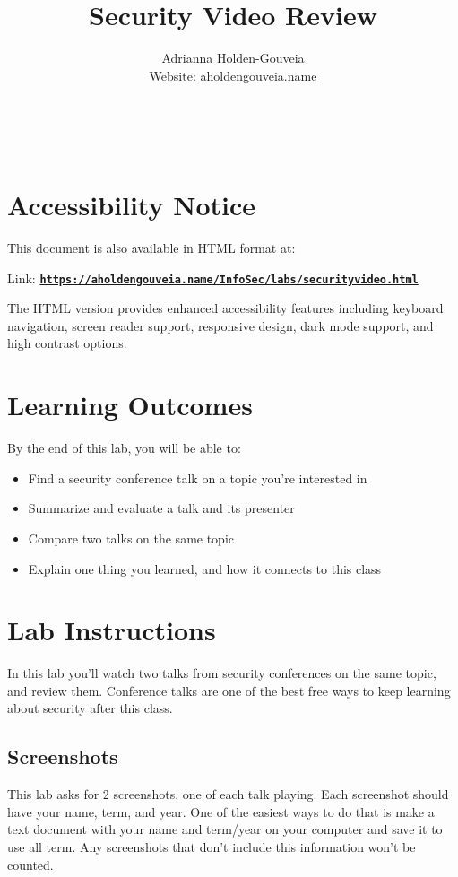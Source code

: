 \documentclass[12pt]{article}
\title{Security Video Review}
\author{
        Adrianna Holden-Gouveia \\
        Website: \href{https://aholdengouveia.name}{aholdengouveia.name}\\ 
        \date{\vspace{-5ex}}
        \faGithub {: aholdengouveia} \\
        \faTwitter {: aholdengouveia} \\
        }
\begin{document}
    

\maketitle

\section*{Accessibility Notice}
This document is also available in HTML format at:

Link: \href{https://aholdengouveia.name/InfoSec/labs/securityvideo.html}{\textbf{\nolinkurl{https://aholdengouveia.name/InfoSec/labs/securityvideo.html}}}

The HTML version provides enhanced accessibility features including keyboard navigation, screen reader support, responsive design, dark mode support, and high contrast options.



\section*{Learning Outcomes}
By the end of this lab, you will be able to:
\begin{itemize}
    \item Find a security conference talk on a topic you're interested in
    \item Summarize and evaluate a talk and its presenter
    \item Compare two talks on the same topic
    \item Explain one thing you learned, and how it connects to this class
\end{itemize}

\section*{Lab Instructions}
In this lab you'll watch two talks from security conferences on the same topic, and review them. Conference talks are one of the best free ways to keep learning about security after this class.

\subsection*{Screenshots}
This lab asks for 2 screenshots, one of each talk playing. Each screenshot should have your name, term, and year.  One of the easiest ways to do that is make a text document with your name and term/year on your computer and save it to use all term. Any screenshots that don't include this information won't be counted.
\end{document}
